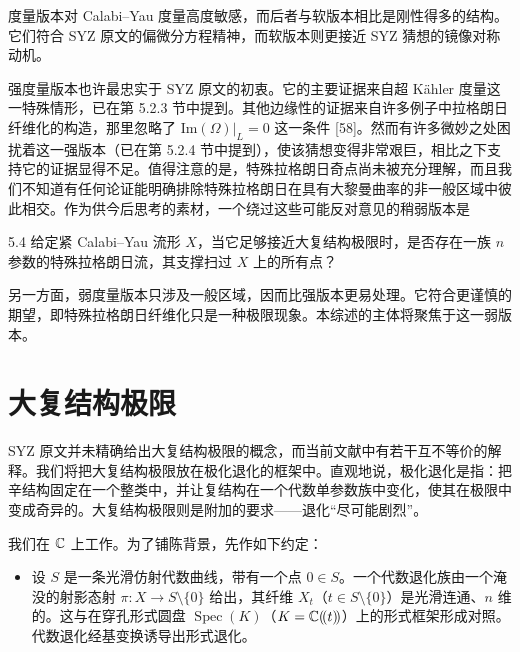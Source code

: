 
度量版本对 Calabi--Yau 度量高度敏感，而后者与软版本相比是刚性得多的结构。它们符合 SYZ 原文的偏微分方程精神，而软版本则更接近 SYZ 猜想的镜像对称动机。

强度量版本也许最忠实于 SYZ 原文的初衷。它的主要证据来自超 Kähler 度量这一特殊情形，已在第 5.2.3 节中提到。其他边缘性的证据来自许多例子中拉格朗日纤维化的构造，那里忽略了 $\mathrm{Im}(\Omega)|_L=0$ 这一条件 [58]。然而有许多微妙之处困扰着这一强版本（已在第 5.2.4 节中提到），使该猜想变得非常艰巨，相比之下支持它的证据显得不足。值得注意的是，特殊拉格朗日奇点尚未被充分理解，而且我们不知道有任何论证能明确排除特殊拉格朗日在具有大黎曼曲率的非一般区域中彼此相交。作为供今后思考的素材，一个绕过这些可能反对意见的稍弱版本是

\begin{question}{5.4}
给定紧 Calabi--Yau 流形 $X$，当它足够接近大复结构极限时，是否存在一族 $n$ 参数的特殊拉格朗日流，其支撑扫过 $X$ 上的所有点？
\end{question}

另一方面，弱度量版本只涉及一般区域，因而比强版本更易处理。它符合更谨慎的期望，即特殊拉格朗日纤维化只是一种极限现象。本综述的主体将聚焦于这一弱版本。

\section{大复结构极限}

SYZ 原文并未精确给出大复结构极限的概念，而当前文献中有若干互不等价的解释。我们将把大复结构极限放在极化退化的框架中。直观地说，极化退化是指：把辛结构固定在一个整类中，并让复结构在一个代数单参数族中变化，使其在极限中变成奇异的。大复结构极限则是附加的要求------退化“尽可能剧烈”。

我们在 $\mathbb{C}$ 上工作。为了铺陈背景，先作如下约定：
\begin{itemize}
\item 设 $S$ 是一条光滑仿射代数曲线，带有一个点 $0\in S$。一个代数退化族由一个淹没的射影态射 $\pi:X\to S\setminus\{0\}$ 给出，其纤维 $X_t$（$t\in S\setminus\{0\}$）是光滑连通、$n$ 维的。这与在穿孔形式圆盘 $\operatorname{Spec}(K)$（$K=\mathbb{C}(\!(t)\!)$）上的形式框架形成对照。代数退化经基变换诱导出形式退化。
\end{itemize}


